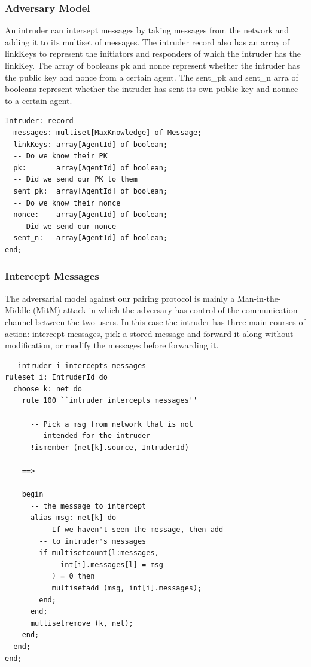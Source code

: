 \documentclass{acm_proc_article-sp}
\begin{document}
\subsubsection{Adversary Model}
An intruder can intersept messages by taking messages from the network and adding it to its multiset of messages. The intruder record also has an array of linkKeys to represent the initiators and responders of which the intruder has the linkKey. The array of booleans pk and nonce represent whether the intruder has the public key and nonce from a certain agent. The sent\_pk and sent\_n arra of booleans represent whether the intruder has sent its own public key and nounce to a certain agent.
\begin{verbatim}
Intruder: record 
  messages: multiset[MaxKnowledge] of Message;
  linkKeys: array[AgentId] of boolean;
  -- Do we know their PK
  pk:       array[AgentId] of boolean;
  -- Did we send our PK to them
  sent_pk:  array[AgentId] of boolean;
  -- Do we know their nonce
  nonce:    array[AgentId] of boolean;
  -- Did we send our nonce
  sent_n:   array[AgentId] of boolean;
end;
\end{verbatim}


\subsubsection{Intercept Messages}
The adversarial model against our pairing protocol is mainly a Man-in-the-Middle (MitM) attack in which the adversary has control of the communication channel between the two users. In this case the intruder has three main courses of action: intercept messages, pick a stored message and forward it along without modification, or modify the messages before forwarding it.

\begin{verbatim}
-- intruder i intercepts messages
ruleset i: IntruderId do
  choose k: net do
    rule 100 ``intruder intercepts messages''
      
      -- Pick a msg from network that is not
      -- intended for the intruder
      !ismember (net[k].source, IntruderId)

    ==>

    begin
      -- the message to intercept
      alias msg: net[k] do
        -- If we haven't seen the message, then add
        -- to intruder's messages
        if multisetcount(l:messages,
             int[i].messages[l] = msg
           ) = 0 then
           multisetadd (msg, int[i].messages);
        end;
      end;
      multisetremove (k, net);
    end;
  end;
end;
\end{verbatim}
\end{document}
